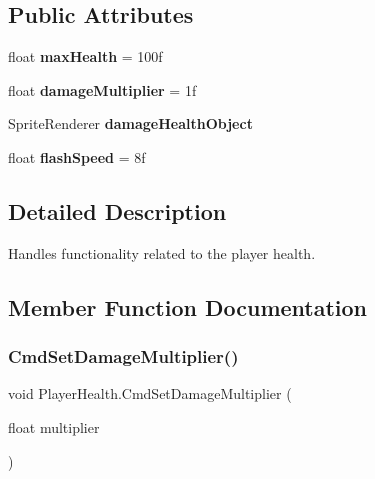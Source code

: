 \subsection*{Public Attributes}
\begin{DoxyCompactItemize}
\item 
\hypertarget{class_player_health_a0090aa3042421f076f73abf8811a1988}{}\label{class_player_health_a0090aa3042421f076f73abf8811a1988} 
float {\bfseries max\+Health} = 100f
\item 
\hypertarget{class_player_health_a2661b9620b2abda2208c53565b27d7b4}{}\label{class_player_health_a2661b9620b2abda2208c53565b27d7b4} 
float {\bfseries damage\+Multiplier} = 1f
\item 
\hypertarget{class_player_health_ab4effc18709ed58d440d58c0cf7d0f4c}{}\label{class_player_health_ab4effc18709ed58d440d58c0cf7d0f4c} 
Sprite\+Renderer {\bfseries damage\+Health\+Object}
\item 
\hypertarget{class_player_health_ae656b18d0b2640ac1c6e5d1b0c003da4}{}\label{class_player_health_ae656b18d0b2640ac1c6e5d1b0c003da4} 
float {\bfseries flash\+Speed} = 8f
\end{DoxyCompactItemize}


\subsection{Detailed Description}
Handles functionality related to the player health. 



\subsection{Member Function Documentation}
\hypertarget{class_player_health_a799bc1eb8d1a4bdb7be804d9e87d87fc}{}\label{class_player_health_a799bc1eb8d1a4bdb7be804d9e87d87fc} 
\subsubsection{\texorpdfstring{Cmd\+Set\+Damage\+Multiplier()}{CmdSetDamageMultiplier()}}
{\footnotesize\ttfamily void Player\+Health.\+Cmd\+Set\+Damage\+Multiplier (\begin{DoxyParamCaption}\item[{float}]{multiplier }\end{DoxyParamCaption})}



